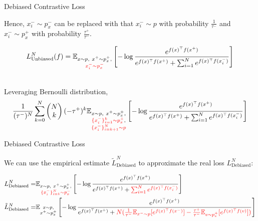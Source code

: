 \documentclass[aspectratio=169,mathserif]{beamer}  %
\newcommand{\E}{\mathbb{E}}
\newcommand{\red}{\textcolor{red}}
\begin{document}
\begin{frame}{Debiased Contrastive Loss}

Hence, $x_i^-\sim p_x^-$ can be replaced with that $x_i^-\sim p$ with probability $\frac{1}{\tau^-}$ and $x_i^-\sim p_x^+$ with probability $\frac{\tau^+}{\tau^-}$.

\begin{eqnarray}
\begin{aligned}
L_{\text{Unbiased}}^N(f)=\E_{\substack{x\sim p,\ x^+\sim p_x^+,\\ \red{x_i^-\sim p_x^-} }}\left[-\log \frac{e^{f(x)^\top f(x^+)}}{e^{f(x)^\top f(x^+)}+ \sum_{i=1}^{N}e^{f(x)^\top f(x_i^-)}} \right]
\end{aligned}
\end{eqnarray}

\pause

~\\
Leveraging Bernoulli distribution,
\begin{eqnarray}
\begin{aligned}
\frac{1}{(\tau^-)^N}\sum_{k=0}^N \left(\begin{matrix}N\\k\end{matrix}\right)(-\tau^+)^k\E_{\substack{x\sim p,\ x^+\sim p_x^+,\\ \red{\{x_i^-\}_{i=1}^k\sim p_x^+},\\ \red{\{x_i^-\}_{i=k+1}^N\sim p}}}\left[-\log \frac{e^{f(x)^\top f(x^+)}}{e^{f(x)^\top f(x^+)}+ \sum_{i=1}^{N}e^{f(x)^\top f(x_i^-)}} \right]
\end{aligned}
\end{eqnarray}

\end{frame}



\begin{frame}{Debiased Contrastive Loss}

We can use the empirical estimate $\tilde{L}_{\text{Debiased}}^N$ to approximate the real loss $L_{\text{Debiased}}^N$:

\begin{eqnarray}
\begin{aligned}
L_{\text{Debiased}}^N=&\E_{\substack{x\sim p,\ x^+\sim p_x^+,\\ \red{\{x_i^-\}_{i=1}^N\sim p_x^-}}}\left[-\log \frac{e^{f(x)^\top f(x^+)}}{e^{f(x)^\top f(x^+)}+ \red{\sum_{i=1}^{N}e^{f(x)^\top f(x_i^-)}}} \right]\\
\tilde{L}_{\text{Debiased}}^N= &\E_{\substack{x\sim p,\\ x^+\sim p_x^+}}\left[-\log \frac{e^{f(x)^\top f(x^+)}}{e^{f(x)^\top f(x^+)} + \red{N(\frac{1}{\tau^-}\E_{x^-\sim p}[e^{f(x)^\top  f(x^-)}]-\frac{\tau^+}{\tau^-}\E_{v\sim p_x^+}[e^{f(x)^\top f(v)}])}} \right]
\end{aligned}
\end{eqnarray}


\end{frame}
\end{document}
